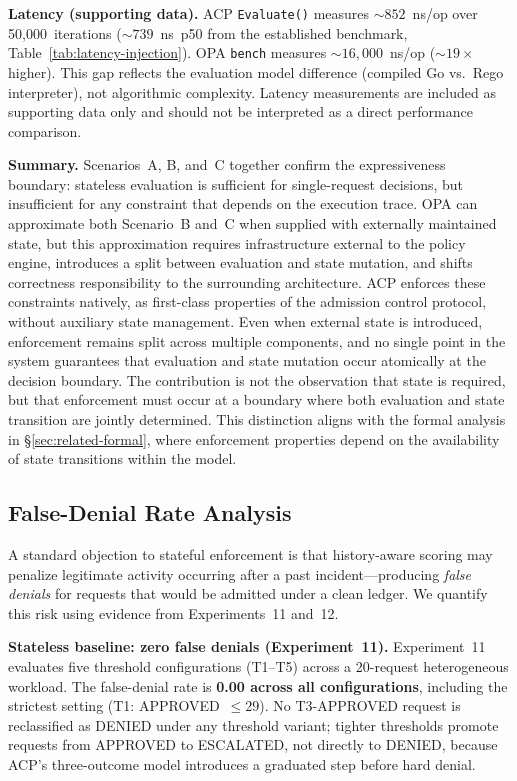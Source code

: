 \documentclass[11pt]{article}
\theoremstyle{definition}
\begin{document}
\textbf{Latency (supporting data).}
ACP \texttt{Evaluate()} measures $\sim\!852$~ns/op over 50{,}000~iterations
($\sim\!739$~ns~p50 from the established benchmark, Table~\ref{tab:latency-injection}).
OPA \texttt{bench} measures $\sim\!16{,}000$~ns/op ($\sim\!19\times$ higher).
This gap reflects the evaluation model difference (compiled Go vs.\ Rego interpreter),
not algorithmic complexity.
Latency measurements are included as supporting data only and should not be interpreted
as a direct performance comparison.

\textbf{Summary.}
Scenarios~A, B, and~C together confirm the expressiveness boundary: stateless evaluation
is sufficient for single-request decisions, but insufficient for any constraint that
depends on the execution trace.
OPA can approximate both Scenario~B and~C when supplied with externally maintained state,
but this approximation requires infrastructure external to the policy engine, introduces
a split between evaluation and state mutation, and shifts correctness responsibility to the
surrounding architecture.
ACP enforces these constraints natively, as first-class properties of the admission
control protocol, without auxiliary state management.
Even when external state is introduced, enforcement remains split across multiple
components, and no single point in the system guarantees that evaluation and state
mutation occur atomically at the decision boundary.
The contribution is not the observation that state is required, but that enforcement
must occur at a boundary where both evaluation and state transition are jointly determined.
This distinction aligns with the formal analysis in \S\ref{sec:related-formal},
where enforcement properties depend on the availability of state transitions
within the model.

\subsection{False-Denial Rate Analysis}
\label{sec:false-denial}

A standard objection to stateful enforcement is that history-aware scoring
may penalize legitimate activity occurring after a past incident---producing
\emph{false denials} for requests that would be admitted under a clean ledger.
We quantify this risk using evidence from Experiments~11 and~12.

\textbf{Stateless baseline: zero false denials (Experiment~11).}
Experiment~11 evaluates five threshold configurations (T1--T5) across a
20-request heterogeneous workload.
The false-denial rate is \textbf{0.00 across all configurations},
including the strictest setting (T1: APPROVED~$\leq 29$).
No T3-APPROVED request is reclassified as DENIED under any threshold variant;
tighter thresholds promote requests from APPROVED to ESCALATED,
not directly to DENIED, because ACP's three-outcome model introduces a
graduated step before hard denial.
\end{document}
